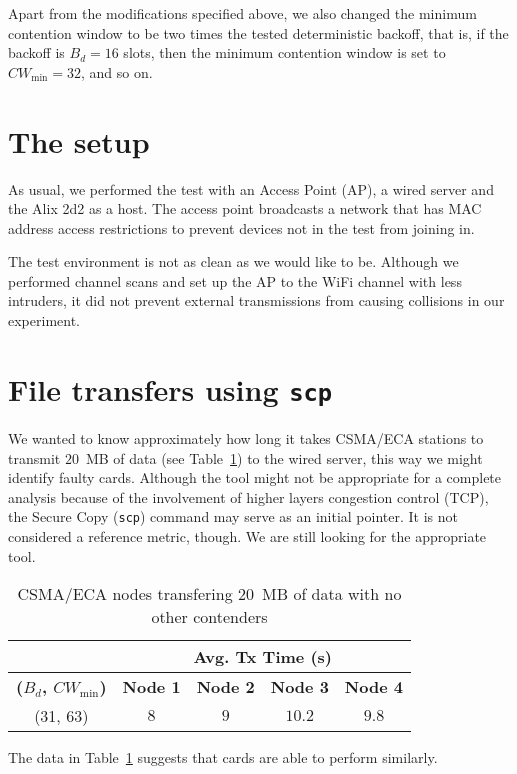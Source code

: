 \documentclass[a4paper]{journal}
\begin{document}
Apart from the modifications specified above, we also changed the minimum contention window to be two times the tested deterministic backoff, that is, if the backoff is $B_{d}=16$ slots, then the minimum contention window is set to $CW_{\min}=32$, and so on.

\section{The setup}
As usual, we performed the test with an Access Point (AP), a wired server and the Alix 2d2 as a host. The access point broadcasts a network that has MAC address access restrictions to prevent devices not in the test from joining in.

The test environment is not as clean as we would like to be. Although we performed channel scans and set up the AP to the WiFi channel with less intruders, it did not prevent external transmissions from causing collisions in our experiment.

\section{File transfers using {\texttt{scp}}}
We wanted to know approximately how long it takes CSMA/ECA stations to transmit $20$~MB of data (see Table~\ref{tab:beca-transfer}) to the wired server, this way we might identify faulty cards. Although the tool might not be appropriate for a complete analysis because of the involvement of higher layers congestion control (TCP), the Secure Copy ({\texttt{scp}}) command may serve as an initial pointer. It is not considered a reference metric, though. We are still looking for the appropriate tool.

\begin{table}[htbp]
		\centering
		\caption{CSMA/ECA nodes transfering $20$~MB of data with no other contenders}
		\label{tab:beca-transfer}
		\begin{tabular}{|c|c|c|c|c|}
			\hline
			\cellcolor{black} & \multicolumn{4}{|c|}{{\bfseries Avg. Tx Time (s)}}\\
			\hline
			{\bfseries ($B_{d}$, $CW_{\min}$)} & {\bfseries Node 1} & {\bfseries Node 2} & {\bfseries Node 3} & {\bfseries Node 4}\\
			\hline
			(31, 63) & $8$ & $9$ & $10.2$ & $9.8$\\
			\hline
		\end{tabular}
\end{table}

The data in Table~\ref{tab:beca-transfer} suggests that cards are able to perform similarly.
\end{document}
